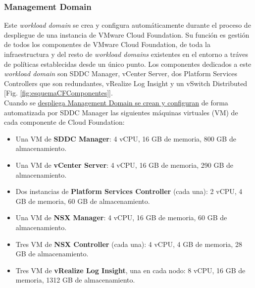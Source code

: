 \subsubsection{Management Domain}
\label{subsubsec:domainManagement}
Este \textit{workload domain} se crea y configura automáticamente durante el proceso de despliegue de una instancia de VMware Cloud Foundation. Su función es gestión de todos los componentes de VMware Cloud Foundation, de toda la infraestructura y del resto de \textit{workload domains} existentes en el entorno a tráves de políticas establecidas desde un único punto. Los componentes dedicados a este \textit{workload domain} son SDDC Manager, vCenter Server, dos Platform Services Controllers que son redundantes, vRealize Log Insight y un vSwitch Distributed [Fig. \ref{fig:esquemaCFComponentes}].\\
Cuando se \underline{despliega Management Domain se crean y configuran} de forma automatizada por SDDC Manager las siguientes máquinas virtuales (VM) de cada componente de Cloud Foundation:
\begin{itemize}
    \item Una VM de \textbf{SDDC Manager}: 4 vCPU, 16 GB de memoria, 800 GB de almacenamiento.
    \item Una VM de \textbf{vCenter Server}: 4 vCPU, 16 GB de memoria, 290 GB de almacenamiento.
    \item Dos instancias de \textbf{Platform Services Controller} (cada una): 2 vCPU, 4 GB de memoria, 60 GB de almacenamiento.
    \item Una VM de \textbf{NSX Manager}: 4 vCPU, 16 GB de memoria, 60 GB de almacenamiento.
    \item Tres VM de \textbf{NSX Controller} (cada una): 4 vCPU, 4 GB de memoria, 28 GB de almacenamiento.
    \item Tres VM de \textbf{vRealize Log Insight}, una en cada nodo: 8 vCPU, 16 GB de memoria, 1312 GB de almacenamiento.
\end{itemize}


